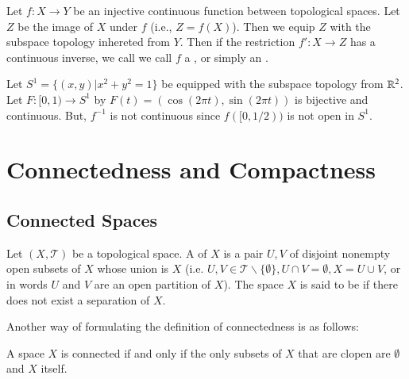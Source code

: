 \documentclass[12pt, a4paper, oneside, openright, titlepage]{book}
\begin{document}
\begin{defn}
    Let $f:X\rightarrow Y$ be an injective continuous function between topological spaces. Let $Z$ be the image of $X$ under $f$ (i.e., $Z = f(X)$). Then we equip $Z$ with the subspace topology inhereted from $Y$. Then if the restriction $f':X\rightarrow Z$ has a continuous inverse, we call we call $f$ a , or simply an .
\end{defn}

\begin{eg}
    Let $S^1 = \{(x,y)\vert x^2+y^2 = 1\}$ be equipped with the subspace topology from $\mathbb R^2$. Let $F:[0,1)\rightarrow S^1$ by $F(t) = (\cos(2\pi t), \sin(2\pi t))$ is bijective and continuous. But, $f^{-1}$ is not continuous since $f([0,1/2))$ is not open in $S^1$.
\end{eg}



\chapter{\textsection Connectedness and Compactness}


\section{Connected Spaces}

\begin{defn}
    Let $(X,\mathcal{T})$ be a topological space. A  of $X$ is a pair $U,V$ of disjoint nonempty open subsets of $X$ whose union is $X$ (i.e. $U,V \in \mathcal{T}\backslash\{\emptyset\}, U\cap V = \emptyset, X = U\cup V$, or in words $U$ and $V$ are an open partition of $X$). The space $X$ is said to be  if there does not exist a separation of $X$.
\end{defn}

Another way of formulating the definition of connectedness is as follows:
\begin{center}
    A space $X$ is connected if and only if the only subsets of $X$ that are clopen are $\emptyset$ and $X$ itself.
\end{center}
\end{document}
